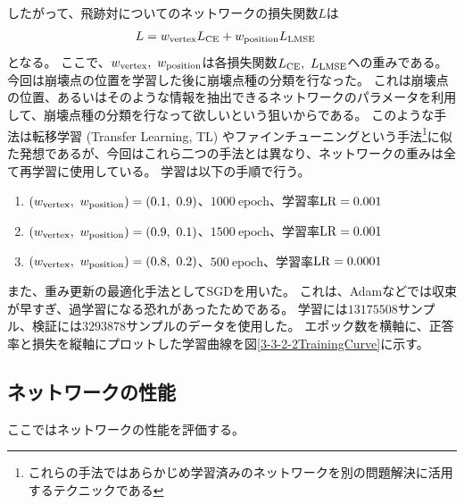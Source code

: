 したがって、飛跡対についてのネットワークの損失関数$L$は
\begin{equation}
 \begin{split}
 L & = w_{\rm vertex} L_{\rm CE} + w_{\rm position} L_{\rm LMSE}
 \end{split}
\end{equation}
となる。
ここで、$w_{\rm vertex},\ w_{\rm position}$は各損失関数$L_{\rm CE},\ L_{\rm LMSE}$への重みである。
今回は崩壊点の位置を学習した後に崩壊点種の分類を行なった。
これは崩壊点の位置、あるいはそのような情報を抽出できるネットワークのパラメータを利用して、崩壊点種の分類を行なって欲しいという狙いからである。
このような手法は転移学習 (Transfer Learning, TL) やファインチューニングという手法\footnote{これらの手法ではあらかじめ学習済みのネットワークを別の問題解決に活用するテクニックである}に似た発想であるが、今回はこれら二つの手法とは異なり、ネットワークの重みは全て再学習に使用している。
学習は以下の手順で行う。

\begin{enumerate}
 \item $(w_{\rm vertex},\ w_{\rm position})=(0.1,\ 0.9)$、$1000\ \mathrm{epoch}$、学習率${\rm LR}=0.001$
 \item $(w_{\rm vertex},\ w_{\rm position})=(0.9,\ 0.1)$、$1500\ \mathrm{epoch}$、学習率${\rm LR}=0.001$
 \item $(w_{\rm vertex},\ w_{\rm position})=(0.8,\ 0.2)$、$500\ \mathrm{epoch}$、学習率${\rm LR}=0.0001$
\end{enumerate}

また、重み更新の最適化手法としてSGDを用いた。
これは、Adamなどでは収束が早すぎ、過学習になる恐れがあったためである。
学習には$13175508$サンプル、検証には$3293878$サンプルのデータを使用した。
エポック数を横軸に、正答率と損失を縦軸にプロットした学習曲線を図\ref{3-3-2-2TrainingCurve}に示す。



\subsection{ネットワークの性能} \label{Net:PM:PerformanceofPM}

ここではネットワークの性能を評価する。

